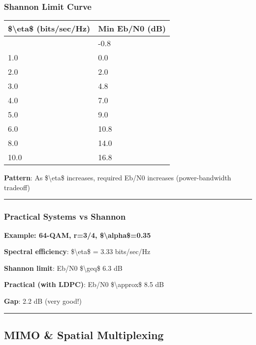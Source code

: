 \subsubsection{Shannon Limit Curve}\label{shannon-limit-curve}

{\def\LTcaptype{} %
\begin{longtable}[]{@{}ll@{}}
\toprule\noalign{}
\$\textbackslash eta\$ (bits/sec/Hz) & Min Eb/N0 (dB) \\
\midrule\noalign{}
\endhead
\bottomrule\noalign{}
\endlastfoot
0.5 & -0.8 \\
1.0 & 0.0 \\
2.0 & 2.0 \\
3.0 & 4.8 \\
4.0 & 7.0 \\
5.0 & 9.0 \\
6.0 & 10.8 \\
8.0 & 14.0 \\
10.0 & 16.8 \\
\end{longtable}
}

\textbf{Pattern}: As \$\textbackslash eta\$ increases, required Eb/N0
increases (power-bandwidth tradeoff)

\begin{center}\rule{0.5\linewidth}{0.5pt}\end{center}

\subsubsection{Practical Systems vs
Shannon}\label{practical-systems-vs-shannon}

\textbf{Example: 64-QAM, r=3/4, \$\textbackslash alpha\$=0.35}

\textbf{Spectral efficiency}: \$\textbackslash eta\$ = 3.33 bits/sec/Hz

\textbf{Shannon limit}: Eb/N0 \$\textbackslash geq\$ 6.3 dB

\textbf{Practical (with LDPC)}: Eb/N0 \$\textbackslash approx\$ 8.5 dB

\textbf{Gap}: 2.2 dB (very good!)

\begin{center}\rule{0.5\linewidth}{0.5pt}\end{center}

\subsection{MIMO \& Spatial
Multiplexing}\label{mimo-spatial-multiplexing}

